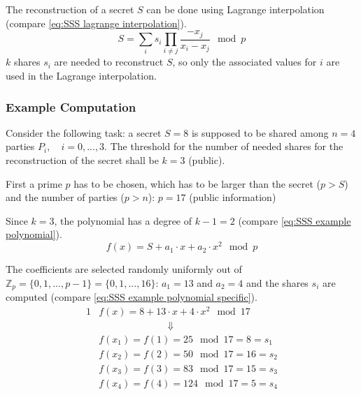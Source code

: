 			
		
		The reconstruction of a secret $S$ can be done using Lagrange interpolation (compare \ref{eq:SSS lagrange interpolation}).
		\begin{equation}
		\label{eq:SSS lagrange interpolation}
		S = \sum_i s_i \prod_{i \neq j} \frac{-x_j}{x_i-x_j} \mod p
		\end{equation}
		 $k$ shares $s_i$ are needed to reconstruct $S$, so only the associated values for $i$ are used in the Lagrange interpolation.
						
		\subsubsection{Example Computation}
		\label{Example Computation}
		
		Consider the following task: a secret $S=8$ is supposed to be shared among $n=4$ parties $P_i,\quad i=0,...,3$. The threshold for the number of needed shares for the reconstruction of the secret shall be $k=3$ (public).
		
		First a prime $p$ has to be chosen, which has to be larger than the secret ($p>S$) and the number of parties ($p>n$): $p=17$ (public information)
		
		Since $k=3$, the polynomial has a degree of $k-1=2$ (compare \ref{eq:SSS example polynomial}).
		\begin{equation}
		\label{eq:SSS example polynomial}
		f(x) = S + a_1 \cdot x + a_2 \cdot x^2 \mod p
		\end{equation}
		 
		 The coefficients are selected randomly uniformly out of $\mathbb{Z}_p=\{0,1,...,p-1\}=\{0,1,...,16\}$: $a_1=13$ and $a_2=4$ and the shares $s_i$ are computed (compare \ref{eq:SSS example polynomial specific}).
		 \begin{alignat}{1}
		 & f(x) = 8 + 13 \cdot x + 4 \cdot x^2 \mod 17 \label{eq:SSS example polynomial specific} \\
		 &\qquad \qquad \qquad \quad \Downarrow \nonumber \\ 
		 & f(x_1)=f(1)=25\mod17=8=s_1 \nonumber \\
		 & f(x_2)=f(2)=50\mod17=16=s_2 \nonumber \\
		 & f(x_3)=f(3)=83\mod17=15=s_3 \nonumber \\
		 & f(x_4)=f(4)=124\mod17=5=s_4 \nonumber 
		 \end{alignat}
		 
